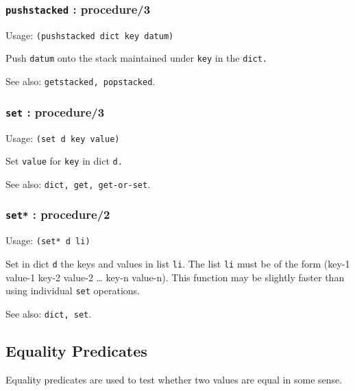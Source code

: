 \documentclass[
]{article}
\newcommand{\passthrough}[1]{#1}
\begin{document}
\hypertarget{pushstacked-procedure3}{%
\subsubsection{\texorpdfstring{\texttt{pushstacked} :
procedure/3}{pushstacked : procedure/3}}\label{pushstacked-procedure3}}

Usage: \passthrough{\lstinline!(pushstacked dict key datum)!}

Push \passthrough{\lstinline!datum!} onto the stack maintained under
\passthrough{\lstinline!key!} in the \passthrough{\lstinline!dict.!}

See also: \passthrough{\lstinline!getstacked, popstacked!}.

\hypertarget{set-procedure3}{%
\subsubsection{\texorpdfstring{\texttt{set} :
procedure/3}{set : procedure/3}}\label{set-procedure3}}

Usage: \passthrough{\lstinline!(set d key value)!}

Set \passthrough{\lstinline!value!} for \passthrough{\lstinline!key!} in
dict \passthrough{\lstinline!d.!}

See also: \passthrough{\lstinline!dict, get, get-or-set!}.

\hypertarget{set-procedure2}{%
\subsubsection{\texorpdfstring{\texttt{set*} :
procedure/2}{set* : procedure/2}}\label{set-procedure2}}

Usage: \passthrough{\lstinline!(set* d li)!}

Set in dict \passthrough{\lstinline!d!} the keys and values in list
\passthrough{\lstinline!li!}. The list \passthrough{\lstinline!li!} must
be of the form (key-1 value-1 key-2 value-2 \ldots{} key-n value-n).
This function may be slightly faster than using individual
\passthrough{\lstinline!set!} operations.

See also: \passthrough{\lstinline!dict, set!}.

\hypertarget{equality-predicates}{%
\subsection{Equality Predicates}\label{equality-predicates}}

Equality predicates are used to test whether two values are equal in
some sense.
\end{document}
